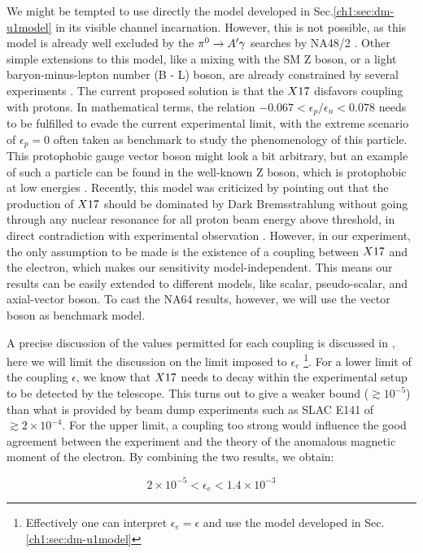 We might be tempted to use directly the model developed in Sec.\ref{ch1:sec:dm-u1model} in its visible channel incarnation. However, this is not possible, as this model is already well excluded by the $\pi^0 \to A' \gamma$ searches by NA48/2 \cite{na48}. Other simple extensions to this model, like a mixing with the SM Z boson, or a light baryon-minus-lepton number (B - L) boson, are already constrained by several experiments \cite{PhysRevD.95.035017}. The current proposed solution is that the $X17$ disfavors coupling with protons. In mathematical terms, the relation $-0.067 < \epsilon_p/\epsilon_n < 0.078$ needs to be fulfilled to evade the current experimental limit, with the extreme scenario of $\epsilon_p = 0$ often taken as benchmark to study the phenomenology of this particle. This protophobic gauge vector boson might look a bit arbitrary, but an example of such a particle can be found in the well-known Z boson, which is protophobic at low energies \cite{PhysRevD.95.035017}. Recently, this model was criticized by pointing out that the production of $X17$ should be dominated by Dark Bremsstrahlung without going through any nuclear resonance for all proton beam energy above threshold, in direct contradiction with experimental observation \cite{zhang2020protophobic}.  However, in our experiment, the only assumption to be made is the existence of a coupling between $X17$ and the electron, which makes our sensitivity model-independent. This means our results can be easily extended to different models, like scalar, pseudo-scalar, and axial-vector boson. To cast the NA64 results, however, we will use the vector boson as benchmark model.

A precise discussion of the values permitted for each coupling is discussed in \cite{Feng:2016jff,PhysRevD.95.035017}, here we will limit the discussion on the limit imposed to $\epsilon_e$ \footnote{Effectively one can interpret $\epsilon_e = \epsilon$ and use the model developed in Sec.\ref{ch1:sec:dm-u1model}}. For a lower limit of the coupling $\epsilon$, we know that $X17$ needs to decay within the experimental setup to be detected by the telescope. This turns out to give a weaker bound ($\gtrsim 10^{-5}$) than what is provided by beam dump experiments such as SLAC E141 \cite{blum} of $\gtrsim 2 \times 10^{-4}$. For the upper limit, a coupling too strong would influence the good agreement between the experiment and the theory of the anomalous magnetic moment of the electron. By combining the two results, we obtain:

\begin{equation}
  \label{eq:x17-limits}
  2 \times 10^{-5} < \epsilon_e < 1.4 \times 10^{-3}
\end{equation}

